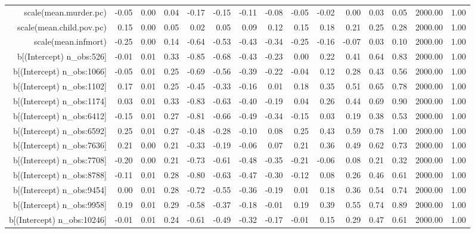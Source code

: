 \begin{table}[ht]
\begin{tabular}{rrrrrrrrrrrrrrr}
  scale(mean.murder.pc) & -0.05 & 0.00 & 0.04 & -0.17 & -0.15 & -0.11 & -0.08 & -0.05 & -0.02 & 0.00 & 0.03 & 0.05 & 2000.00 & 1.00 \\ 
  scale(mean.child.pov.pc) & 0.15 & 0.00 & 0.05 & 0.02 & 0.05 & 0.09 & 0.12 & 0.15 & 0.18 & 0.21 & 0.25 & 0.28 & 2000.00 & 1.00 \\ 
  scale(mean.infmort) & -0.25 & 0.00 & 0.14 & -0.64 & -0.53 & -0.43 & -0.34 & -0.25 & -0.16 & -0.07 & 0.03 & 0.10 & 2000.00 & 1.00 \\ 
  b[(Intercept) n\_obs:526] & -0.01 & 0.01 & 0.33 & -0.85 & -0.68 & -0.43 & -0.23 & 0.00 & 0.22 & 0.41 & 0.64 & 0.83 & 2000.00 & 1.00 \\ 
  b[(Intercept) n\_obs:1066] & -0.05 & 0.01 & 0.25 & -0.69 & -0.56 & -0.39 & -0.22 & -0.04 & 0.12 & 0.28 & 0.43 & 0.56 & 2000.00 & 1.00 \\ 
  b[(Intercept) n\_obs:1102] & 0.17 & 0.01 & 0.25 & -0.45 & -0.33 & -0.16 & 0.01 & 0.18 & 0.35 & 0.51 & 0.65 & 0.78 & 2000.00 & 1.00 \\ 
  b[(Intercept) n\_obs:1174] & 0.03 & 0.01 & 0.33 & -0.83 & -0.63 & -0.40 & -0.19 & 0.04 & 0.26 & 0.44 & 0.69 & 0.90 & 2000.00 & 1.00 \\ 
  b[(Intercept) n\_obs:6412] & -0.15 & 0.01 & 0.27 & -0.81 & -0.66 & -0.49 & -0.34 & -0.15 & 0.03 & 0.19 & 0.38 & 0.53 & 2000.00 & 1.00 \\ 
  b[(Intercept) n\_obs:6592] & 0.25 & 0.01 & 0.27 & -0.48 & -0.28 & -0.10 & 0.08 & 0.25 & 0.43 & 0.59 & 0.78 & 1.00 & 2000.00 & 1.00 \\ 
  b[(Intercept) n\_obs:7636] & 0.21 & 0.00 & 0.21 & -0.33 & -0.19 & -0.06 & 0.07 & 0.21 & 0.36 & 0.49 & 0.62 & 0.73 & 2000.00 & 1.00 \\ 
  b[(Intercept) n\_obs:7708] & -0.20 & 0.00 & 0.21 & -0.73 & -0.61 & -0.48 & -0.35 & -0.21 & -0.06 & 0.08 & 0.21 & 0.32 & 2000.00 & 1.00 \\ 
  b[(Intercept) n\_obs:8788] & -0.11 & 0.01 & 0.28 & -0.80 & -0.63 & -0.47 & -0.30 & -0.12 & 0.08 & 0.26 & 0.46 & 0.61 & 2000.00 & 1.00 \\ 
  b[(Intercept) n\_obs:9454] & 0.00 & 0.01 & 0.28 & -0.72 & -0.55 & -0.36 & -0.19 & 0.01 & 0.18 & 0.36 & 0.54 & 0.74 & 2000.00 & 1.00 \\ 
  b[(Intercept) n\_obs:9958] & 0.19 & 0.01 & 0.29 & -0.58 & -0.37 & -0.18 & -0.01 & 0.19 & 0.39 & 0.55 & 0.74 & 0.89 & 2000.00 & 1.00 \\ 
  b[(Intercept) n\_obs:10246] & -0.01 & 0.01 & 0.24 & -0.61 & -0.49 & -0.32 & -0.17 & -0.01 & 0.15 & 0.29 & 0.47 & 0.61 & 2000.00 & 1.00 \\ 

\end{tabular}
\end{table}
